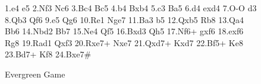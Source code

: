 

\usepackage{skak}
\usepackage{texmate}


	
	\begin{figure}[h]
		
		\renewcommand{\afterno}{.}

		\caption*{Evergreen Game}
	
		
		\makegametitle
	
		\begin{texmate}
			1.e4 e5 2.Nf3 Nc6 3.Bc4 Bc5 4.b4 Bxb4 5.c3 Ba5 6.d4 exd4 7.O-O d3
			8.Qb3 Qf6 9.e5 Qg6 10.Re1 Nge7 11.Ba3 b5 12.Qxb5 Rb8 13.Qa4 Bb6
			14.Nbd2 Bb7 15.Ne4 Qf5 16.Bxd3 Qh5 17.Nf6+ gxf6 18.exf6 Rg8 19.Rad1 Qxf3
			20.Rxe7+ Nxe7 21.Qxd7+ Kxd7 22.Bf5+ Ke8 23.Bd7+ Kf8 24.Bxe7\# 
		\end{texmate}
	
		\vspace{20pt}
		\normalboard
		\notationon
		\preparediagram{}{}
		\makediagrams
		
		\label{fig:EvergreenGame}	
	
	\end{figure}

